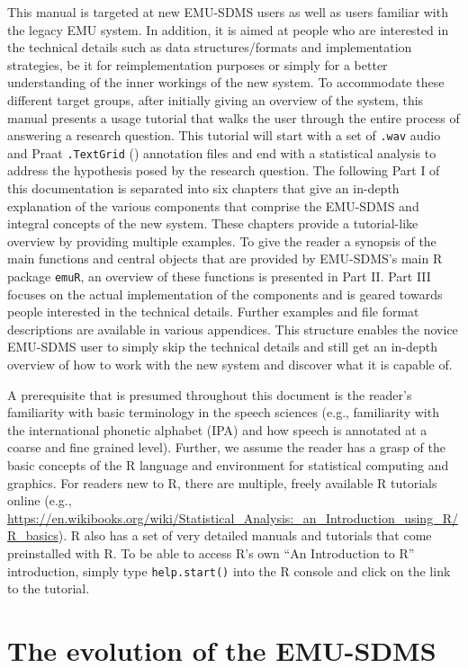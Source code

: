 \documentclass[]{book}
\theoremstyle{definition}
\theoremstyle{definition}
\theoremstyle{definition}
\theoremstyle{remark}
\begin{document}
This manual is targeted at new EMU-SDMS users as well as users familiar
with the legacy EMU system. In addition, it is aimed at people who are
interested in the technical details such as data structures/formats and
implementation strategies, be it for reimplementation purposes or simply
for a better understanding of the inner workings of the new system. To
accommodate these different target groups, after initially giving an
overview of the system, this manual presents a usage tutorial that walks
the user through the entire process of answering a research question.
This tutorial will start with a set of \texttt{.wav} audio and Praat
\texttt{.TextGrid} (\citet{boersma:2011a}) annotation files and end with
a statistical analysis to address the hypothesis posed by the research
question. The following Part I of this documentation is separated into
six chapters that give an in-depth explanation of the various components
that comprise the EMU-SDMS and integral concepts of the new system.
These chapters provide a tutorial-like overview by providing multiple
examples. To give the reader a synopsis of the main functions and
central objects that are provided by EMU-SDMS's main R package
\texttt{emuR}, an overview of these functions is presented in Part II.
Part III focuses on the actual implementation of the components and is
geared towards people interested in the technical details. Further
examples and file format descriptions are available in various
appendices. This structure enables the novice EMU-SDMS user to simply
skip the technical details and still get an in-depth overview of how to
work with the new system and discover what it is capable of.

A prerequisite that is presumed throughout this document is the reader's
familiarity with basic terminology in the speech sciences (e.g.,
familiarity with the international phonetic alphabet (IPA) and how
speech is annotated at a coarse and fine grained level). Further, we
assume the reader has a grasp of the basic concepts of the R language
and environment for statistical computing and graphics. For readers new
to R, there are multiple, freely available R tutorials online (e.g.,
\url{https://en.wikibooks.org/wiki/Statistical_Analysis:_an_Introduction_using_R/R_basics}).
R also has a set of very detailed manuals and tutorials that come
preinstalled with R. To be able to access R's own ``An Introduction to
R'' introduction, simply type \texttt{help.start()} into the R console
and click on the link to the tutorial.

\hypertarget{the-evolution-of-the-emu-sdms}{%
\section{The evolution of the
EMU-SDMS}\label{the-evolution-of-the-emu-sdms}}
\end{document}
